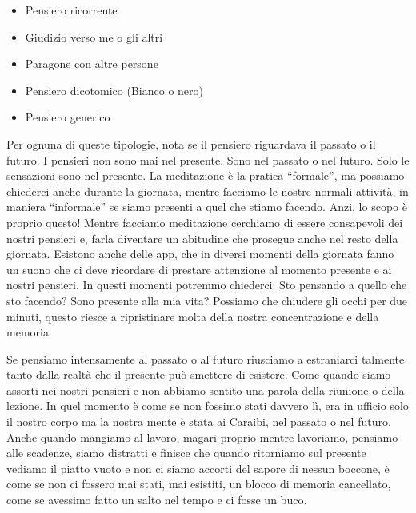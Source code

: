\documentclass[12pt]{book} %
\begin{document}
\begin{itemize}
\item Pensiero ricorrente
\item Giudizio verso me o gli altri
\item Paragone con altre persone
\item Pensiero dicotomico (Bianco o nero)
\item Pensiero generico
\end{itemize}
Per ognuna di queste tipologie, nota se il pensiero riguardava il passato o il futuro. I pensieri non sono mai nel
presente. Sono nel passato o nel futuro. Solo le sensazioni sono nel presente. La meditazione è la pratica “formale”,
ma possiamo chiederci anche durante la giornata, mentre facciamo le nostre normali attività, in maniera “informale” se
siamo presenti a quel che stiamo facendo. Anzi, lo scopo è proprio questo! Mentre facciamo meditazione cerchiamo di
essere consapevoli dei nostri pensieri e, farla diventare un abitudine che prosegue anche nel resto della giornata.
Esistono anche delle app, che in diversi momenti della giornata fanno un suono che ci deve ricordare di prestare
attenzione al momento presente e ai nostri pensieri. In questi momenti potremmo chiederci: Sto pensando a quello che
sto facendo? Sono presente alla mia vita? Possiamo che chiudere gli occhi per due minuti, questo riesce a ripristinare
molta della nostra concentrazione e della memoria

Se pensiamo intensamente al passato o al futuro riusciamo a estraniarci talmente tanto dalla realtà che il presente può
smettere di esistere. Come quando siamo assorti nei nostri pensieri e non abbiamo sentito una parola della riunione o
della lezione. In quel momento è come se non fossimo stati davvero lì, era in ufficio solo il nostro corpo ma la nostra
mente è stata ai Caraibi, nel passato o nel futuro. Anche quando mangiamo al lavoro, magari proprio mentre lavoriamo,
pensiamo alle scadenze, siamo distratti e finisce che quando ritorniamo sul presente vediamo il piatto vuoto e non ci
siamo accorti del sapore di nessun boccone, è come se non ci fossero mai stati, mai esistiti, un blocco di memoria
cancellato, come se avessimo fatto un salto nel tempo e ci fosse un buco.


\bigskip
\end{document}
